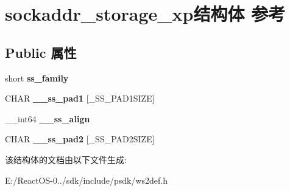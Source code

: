 \hypertarget{structsockaddr__storage__xp}{}\section{sockaddr\+\_\+storage\+\_\+xp结构体 参考}
\label{structsockaddr__storage__xp}
\subsection*{Public 属性}
\begin{DoxyCompactItemize}
\item 
\mbox{\label{structsockaddr__storage__xp_a97766a447c6f533fd48a9d9e7dbe3c70}} 
short {\bfseries ss\+\_\+family}
\item 
\mbox{\label{structsockaddr__storage__xp_a95df4c5481da75f59ca86c68751747e9}} 
C\+H\+AR {\bfseries \+\_\+\+\_\+ss\+\_\+pad1} \mbox{[}\+\_\+\+S\+S\+\_\+\+P\+A\+D1\+S\+I\+ZE\mbox{]}
\item 
\mbox{\label{structsockaddr__storage__xp_aa1b74e44f17201324087633a748c4f6c}} 
\+\_\+\+\_\+int64 {\bfseries \+\_\+\+\_\+ss\+\_\+align}
\item 
\mbox{\label{structsockaddr__storage__xp_a2613d9a3f4cda0a26049f036092e6fbd}} 
C\+H\+AR {\bfseries \+\_\+\+\_\+ss\+\_\+pad2} \mbox{[}\+\_\+\+S\+S\+\_\+\+P\+A\+D2\+S\+I\+ZE\mbox{]}
\end{DoxyCompactItemize}


该结构体的文档由以下文件生成\+:\begin{DoxyCompactItemize}
\item 
E\+:/\+React\+O\+S-\/0../sdk/include/psdk/ws2def.\+h\end{DoxyCompactItemize}
